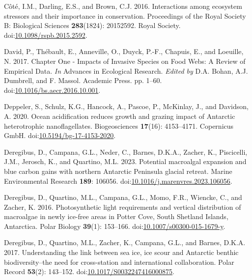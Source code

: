 \documentclass[
]{article}
\newlength{\cslhangindent}
\newenvironment{CSLReferences}[2] %
 {\begin{list}{}{%
  \setlength{\itemindent}{0pt}
  \setlength{\leftmargin}{0pt}
  \setlength{\parsep}{0pt}
  \ifodd #1
   \setlength{\leftmargin}{\cslhangindent}
   \setlength{\itemindent}{-1\cslhangindent}
  \fi
  \setlength{\itemsep}{#2\baselineskip}}}
 {\end{list}}
\begin{document}
\begin{CSLReferences}{1}{0}
Côté, I.M., Darling, E.S., and Brown, C.J. 2016. Interactions among
ecosystem stressors and their importance in conservation. Proceedings of
the Royal Society B: Biological Sciences \textbf{283}(1824): 20152592.
Royal Society.
doi:\href{https://doi.org/10.1098/rspb.2015.2592}{10.1098/rspb.2015.2592}.

David, P., Thébault, E., Anneville, O., Duyck, P.-F., Chapuis, E., and
Loeuille, N. 2017. Chapter {One} - {Impacts} of {Invasive Species} on
{Food Webs}: {A Review} of {Empirical Data}. \emph{In} Advances in
{Ecological Research}. \emph{Edited by} D.A. Bohan, A.J. Dumbrell, and
F. Massol. Academic Press. pp. 1--60.
doi:\href{https://doi.org/10.1016/bs.aecr.2016.10.001}{10.1016/bs.aecr.2016.10.001}.

Deppeler, S., Schulz, K.G., Hancock, A., Pascoe, P., McKinlay, J., and
Davidson, A. 2020. Ocean acidification reduces growth and grazing impact
of {Antarctic} heterotrophic nanoflagellates. Biogeosciences
\textbf{17}(16): 4153--4171. Copernicus GmbH.
doi:\href{https://doi.org/10.5194/bg-17-4153-2020}{10.5194/bg-17-4153-2020}.

Deregibus, D., Campana, G.L., Neder, C., Barnes, D.K.A., Zacher, K.,
Piscicelli, J.M., Jerosch, K., and Quartino, M.L. 2023. Potential
macroalgal expansion and blue carbon gains with northern {Antarctic
Peninsula} glacial retreat. Marine Environmental Research \textbf{189}:
106056.
doi:\href{https://doi.org/10.1016/j.marenvres.2023.106056}{10.1016/j.marenvres.2023.106056}.

Deregibus, D., Quartino, M.L., Campana, G.L., Momo, F.R., Wiencke, C.,
and Zacher, K. 2016. Photosynthetic light requirements and vertical
distribution of macroalgae in newly ice-free areas in {Potter Cove},
{South Shetland Islands}, {Antarctica}. Polar Biology \textbf{39}(1):
153--166.
doi:\href{https://doi.org/10.1007/s00300-015-1679-y}{10.1007/s00300-015-1679-y}.

Deregibus, D., Quartino, M.L., Zacher, K., Campana, G.L., and Barnes,
D.K.A. 2017. Understanding the link between sea ice, ice scour and
{Antarctic} benthic biodiversity--the need for cross-station and
international collaboration. Polar Record \textbf{53}(2): 143--152.
doi:\href{https://doi.org/10.1017/S0032247416000875}{10.1017/S0032247416000875}.


\end{CSLReferences}
\end{document}
